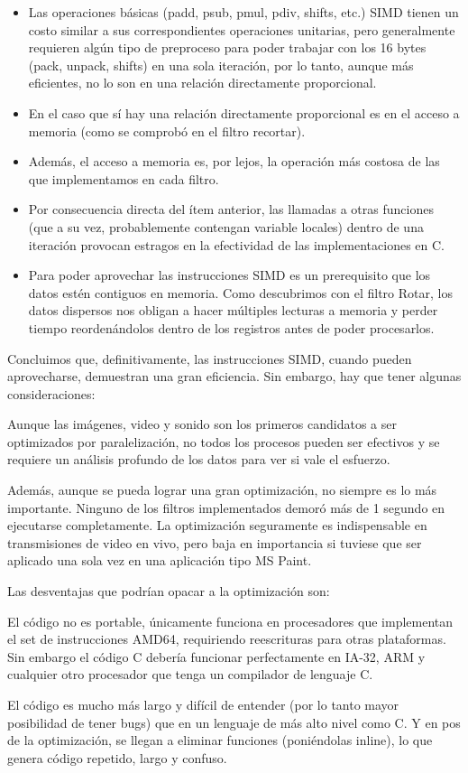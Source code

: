 \documentclass[a4paper,10pt,twoside]{article}
\begin{document}
\begin{itemize}
\item Las operaciones básicas (padd, psub, pmul, pdiv, shifts, etc.) SIMD tienen un costo similar a sus correspondientes operaciones unitarias, pero generalmente requieren algún tipo de preproceso para poder trabajar con los 16 bytes (pack, unpack, shifts) en una sola iteración, por lo tanto, aunque más eficientes, no lo son en una relación directamente proporcional.
\item En el caso que sí hay una relación directamente proporcional es en el acceso a memoria (como se comprobó en el filtro recortar).
\item Además, el acceso a memoria es, por lejos, la operación más costosa de las que implementamos en cada filtro.
\item Por consecuencia directa del ítem anterior, las llamadas a otras funciones (que a su vez, probablemente contengan variable locales) dentro de una iteración provocan estragos en la efectividad de las implementaciones en C.
\item Para poder aprovechar las instrucciones SIMD es un prerequisito que los datos estén contiguos en memoria. Como descubrimos con el filtro Rotar, los datos dispersos nos obligan a hacer múltiples lecturas a memoria y perder tiempo reordenándolos dentro de los registros antes de poder procesarlos.
\end{itemize}

Concluimos que, definitivamente, las instrucciones SIMD, cuando pueden aprovecharse, demuestran una gran eficiencia. Sin embargo, hay que tener algunas consideraciones:

Aunque las imágenes, video y sonido son los primeros candidatos a ser optimizados por paralelización, no todos los procesos pueden ser efectivos y se requiere un análisis profundo de los datos para ver si vale el esfuerzo.

Además, aunque se pueda lograr una gran optimización, no siempre es lo más importante. Ninguno de los filtros implementados demoró más de 1 segundo en ejecutarse completamente. La optimización seguramente es indispensable en transmisiones de video en vivo, pero baja en importancia si tuviese que ser aplicado una sola vez en una aplicación tipo MS Paint.

Las desventajas que podrían opacar a la optimización son:

El código no es portable, únicamente funciona en procesadores que implementan el set de instrucciones AMD64, requiriendo reescrituras para otras plataformas. Sin embargo el código C debería funcionar perfectamente en IA-32, ARM y cualquier otro procesador que tenga un compilador de lenguaje C.

El código es mucho más largo y difícil de entender (por lo tanto mayor posibilidad de tener bugs) que en un lenguaje de más alto nivel como C. Y en pos de la optimización, se llegan a eliminar funciones (poniéndolas inline), lo que genera código repetido, largo y confuso.
\end{document}

